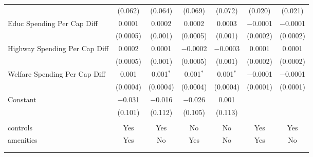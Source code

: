 \begin{table}[!htbp]
\begin{tabular}{@{\extracolsep{5pt}}lcccccc}
  & (0.062) & (0.064) & (0.069) & (0.072) & (0.020) & (0.021) \\ 
  Educ Spending Per Cap Diff & 0.0001 & 0.0002 & 0.0002 & 0.0003 & $-$0.0001 & $-$0.0001 \\ 
  & (0.0005) & (0.001) & (0.0005) & (0.001) & (0.0002) & (0.0002) \\ 
  Highway Spending Per Cap Diff & 0.0002 & 0.0001 & $-$0.0002 & $-$0.0003 & 0.0001 & 0.0001 \\ 
  & (0.0005) & (0.001) & (0.0005) & (0.001) & (0.0002) & (0.0002) \\ 
  Welfare Spending Per Cap Diff & 0.001 & 0.001$^{*}$ & 0.001$^{*}$ & 0.001$^{*}$ & $-$0.0001 & $-$0.0001 \\ 
  & (0.0004) & (0.0004) & (0.0004) & (0.0004) & (0.0001) & (0.0001) \\ 
  Constant & $-$0.031 & $-$0.016 & $-$0.026 & 0.001 &  &  \\ 
  & (0.101) & (0.112) & (0.105) & (0.113) &  &  \\ 
 \hline \\[-1.8ex] 
controls & Yes & Yes & No & No & Yes & Yes \\ 
amenities & Yes & No & Yes & No & Yes & No \\ 
\hline \\[-1.8ex] 
\hline 
\hline \\[-1.8ex] 
\end{tabular} 
\end{table} 
